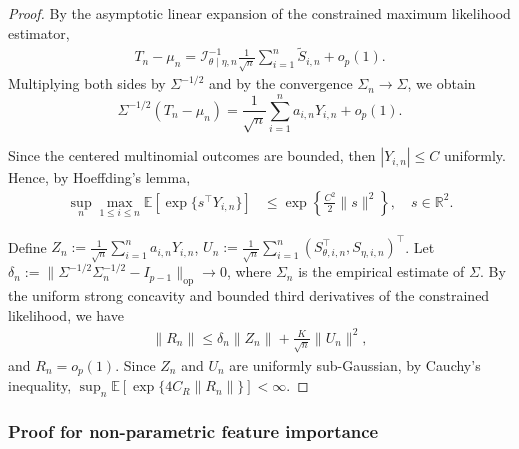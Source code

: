 \documentclass[12pt]{article}
\newcommand{\op}{\mathrm{op}}
\newcommand{\Ee}{{\mathbb{E}}}
\begin{document}
\begin{appendices}
\begin{proof}
    
By the asymptotic linear expansion of the constrained maximum likelihood estimator,
\begin{align*}    
T_n - \mu_n
=\mathcal I_{\theta\mid\eta,n}^{-1}
\frac1{\sqrt n}\sum_{i=1}^n\widetilde S_{i,n}+o_p(1).
\end{align*}
Multiplying both sides by
$\Sigma^{-1/2}$
and by the convergence
\(\Sigma_n \to \Sigma \), we obtain
\[\Sigma^{-1/2}
(T_n - \mu_n)
=
\frac1{\sqrt n}\sum_{i=1}^n a_{i,n}Y_{i,n}
+
o_p(1).
\]


Since the centered multinomial outcomes are bounded, then $|Y_{i,n}|\leq C$ uniformly.
Hence, by Hoeffding's lemma,
\begin{align*}
\sup_n\max_{1\leq i\leq n}
\Ee\left[\exp\{s^\top Y_{i,n}\}\right]
&\leq
\exp\left\{\frac{C^2}{2}\|s\|^2\right\},
\quad s\in\mathbb R^2.
\end{align*}


Define $Z_n:=\frac1{\sqrt n}\sum_{i=1}^n a_{i,n}Y_{i,n}$, $
U_n:=\frac1{\sqrt n}\sum_{i=1}^n
(S_{\theta,i,n}^\top,S_{\eta,i,n})^\top$. Let
$\delta_n:=\|\Sigma^{-1/2}\Sigma_n^{-1/2}-I_{p-1}\|_{\op}\to0$, where $\Sigma_n$ is the empirical estimate of $\Sigma$.
By the uniform strong
concavity and bounded third derivatives of the constrained likelihood, we have
\begin{align*}    
\|R_n\|\leq\delta_n\|Z_n\|+\frac{K}{\sqrt n}\|U_n\|^2,
\end{align*}
and $R_n=o_p(1)$.
Since $Z_n$ and $U_n$ are uniformly sub-Gaussian, by Cauchy's inequality, 
$\sup_n\Ee[\exp\{4C_R\|R_n\|\}]<\infty$.
\end{proof}


\subsubsection{Proof for non-parametric feature importance}


\end{appendices}
\end{document}
